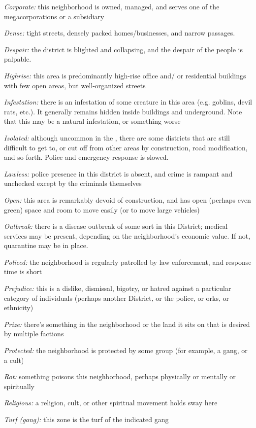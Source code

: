 \documentclass[oneside,10pt]{article}
\begin{document}
\begin{multicols}{2}
\begin{adjustwidth*}{.5cm}{.5cm}
\textit{Corporate:} this neighborhood is owned, managed, and
serves one of the megacorporations or a subsidiary

\textit{Dense:} tight streets, densely packed homes/businesses,
and narrow passages.

\textit{Despair:} the district is blighted and collapsing, and the despair of the people is palpable.

\textit{Highrise:} this area is predominantly high-rise office and/
or residential buildings with few open areas, but well-organized streets

\textit{Infestation:} there is an infestation of some creature in this
area (e.g. goblins, devil rats, etc.). It generally remains hidden inside buildings and underground. Note that this may
be a natural infestation, or something worse

\textit{Isolated:} although uncommon in the \SW{}, there
are some districts that are still difficult to get to, or cut off
from other areas by construction, road modification, and so
forth. Police and emergency response is slowed.

\textit{Lawless:} police presence in this district is absent, and
crime is rampant and unchecked except by the criminals
themselves

\textit{Open:} this area is remarkably devoid of construction, and
has open (perhaps even green) space and room to move
easily (or to move large vehicles)

\textit{Outbreak:} there is a disease outbreak of some sort in this
District; medical services may be present, depending on
the neighborhood’s economic value. If not, quarantine
may be in place.

\textit{Policed:} the neighborhood is regularly patrolled by law enforcement, and response time is short

\textit{Prejudice:} this is a dislike, dismissal, bigotry, or hatred
against a particular category of individuals (perhaps another District, or the police, or orks, or ethnicity)

\textit{Prize:} there’s something in the neighborhood or the land it
sits on that is desired by multiple factions

\textit{Protected:} the neighborhood is protected by some group
(for example, a gang, or a cult)

\textit{Rot:} something poisons this neighborhood, perhaps physically or mentally or spiritually

\textit{Religious:} a religion, cult, or other spiritual movement
holds sway here

\textit{Turf (gang):} this zone is the turf of the indicated gang
\end{adjustwidth*}

\end{multicols}
\end{document}
